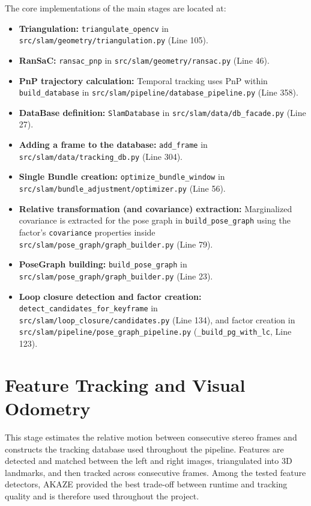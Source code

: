\documentclass[12pt]{article}
\begin{document}
The core implementations of the main stages are located at:
\begin{itemize}
    \item \textbf{Triangulation:} \texttt{triangulate\_opencv} in \nolinkurl{src/slam/geometry/triangulation.py} (Line 105).
    \item \textbf{RanSaC:} \texttt{ransac\_pnp} in \nolinkurl{src/slam/geometry/ransac.py} (Line 46).
    \item \textbf{PnP trajectory calculation:} Temporal tracking uses PnP within \texttt{build\_database} in \nolinkurl{src/slam/pipeline/database\_pipeline.py} (Line 358).
    \item \textbf{DataBase definition:} \texttt{SlamDatabase} in \nolinkurl{src/slam/data/db\_facade.py} (Line 27).
    \item \textbf{Adding a frame to the database:} \texttt{add\_frame} in \nolinkurl{src/slam/data/tracking\_db.py} (Line 304).
    \item \textbf{Single Bundle creation:} \texttt{optimize\_bundle\_window} in \nolinkurl{src/slam/bundle\_adjustment/optimizer.py} (Line 56).
    \item \textbf{Relative transformation (and covariance) extraction:} Marginalized covariance is extracted for the pose graph in \texttt{build\_pose\_graph} using the factor's \texttt{covariance} properties inside \nolinkurl{src/slam/pose\_graph/graph\_builder.py} (Line 79).
    \item \textbf{PoseGraph building:} \texttt{build\_pose\_graph} in \nolinkurl{src/slam/pose\_graph/graph\_builder.py} (Line 23).
    \item \textbf{Loop closure detection and factor creation:} \texttt{detect\_candidates\_for\_keyframe} in \nolinkurl{src/slam/loop\_closure/candidates.py} (Line 134), and factor creation in \nolinkurl{src/slam/pipeline/pose\_graph\_pipeline.py} (\texttt{\_build\_pg\_with\_lc}, Line 123).
\end{itemize}

\section{Feature Tracking and Visual Odometry}
\label{sec:trackAndVO}

This stage estimates the relative motion between consecutive stereo frames and
constructs the tracking database used throughout the pipeline. Features are
detected and matched between the left and right images, triangulated into 3D
landmarks, and then tracked across consecutive frames. Among the tested feature
detectors, AKAZE provided the best trade-off between runtime and tracking
quality and is therefore used throughout the project.
\end{document}

